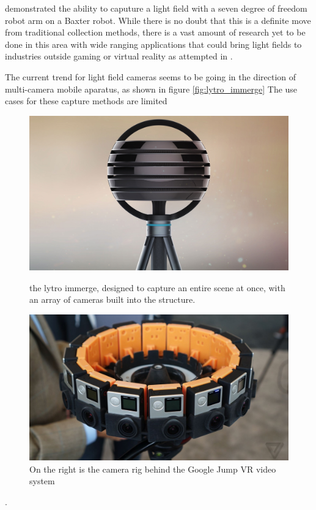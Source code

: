 \documentclass[12pt]{report}
\begin{document}
 \cite{Oberlin16} demonstrated the ability to caputure a light field with a seven degree of freedom robot arm on a Baxter robot. While there is no doubt that this is a definite move from traditional collection methods, there is a vast amount of research yet to be done in this area with wide ranging applications that could bring light fields to industries outside gaming or virtual reality as attempted in \cite{Levoy06b}.

The current trend for light field cameras seems to be going in the direction of multi-camera mobile aparatus, as shown in figure \ref{fig:lytro_immerge}
The use cases for these capture methods are limited
\begin{figure}[!ht]
	\centering
	\begin{minipage}{0.45\textwidth}
		\centering
		\includegraphics[scale=0.08]{lytro_immerge.jpg}
		\caption{the lytro immerge, designed to capture an entire scene at once, with an array of cameras built into the structure.}
		\label{fig:lytro_immerge}
	\end{minipage}\hfill
	\begin{minipage}{0.45\textwidth}
		\centering
		\includegraphics[scale=0.12]{jump_vr_video_cameras.jpg}
		\caption{On the right is the camera rig behind the Google Jump VR video system \cite{Anderson16}}
		\label{fig:jump_cameras}
	\end{minipage}
\end{figure}. 
\end{document}

